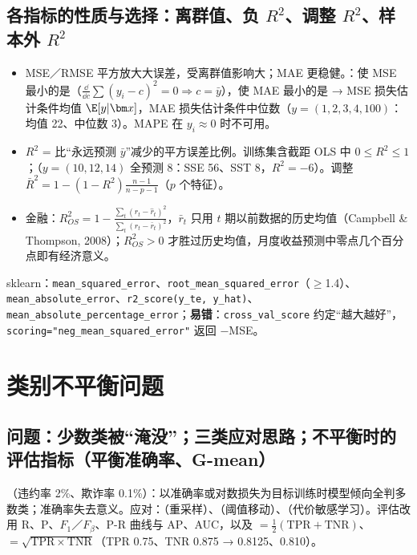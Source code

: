 \subsection{\texorpdfstring{各指标的性质与选择：离群值、负 $R^2$、调整 $R^2$、样本外 $R^2$}{各指标的性质与选择}}
\begin{itemize}
\item MSE／RMSE 平方放大大误差，受离群值影响大；MAE 更稳健。：使 MSE 最小的是（$\frac{\dd}{\dd c}\sum(y_i-c)^2=0\Rightarrow c=\bar y$），使 MAE 最小的是 → MSE 损失估计条件均值 $\E[y|\bm x]$，MAE 损失估计条件中位数（$y=(1,2,3,4,100)$：均值 22、中位数 3）。MAPE 在 $y_i\approx0$ 时不可用。
\item $R^2$ = 比“永远预测 $\bar y$”减少的平方误差比例。训练集含截距 OLS 中 $0\le R^2\le1$；（$y=(10,12,14)$ 全预测 8：SSE 56、SST 8，$R^2=-6$）。调整 $\bar R^2=1-(1-R^2)\frac{n-1}{n-p-1}$（$p$ 个特征）。
\item 金融：$R^2_{OS}=1-\frac{\sum_t(r_t-\hat r_t)^2}{\sum_t(r_t-\bar r_t)^2}$，$\bar r_t$ 只用 $t$ 期以前数据的历史均值（Campbell \& Thompson, 2008）；$R^2_{OS}>0$ 才胜过历史均值，月度收益预测中零点几个百分点即有经济意义。
\end{itemize}
\noindent sklearn：\texttt{mean\_squared\_error}、\texttt{root\_mean\_squared\_error}（$\ge$1.4）、\texttt{mean\_absolute\_error}、\texttt{r2\_score(y\_te, y\_hat)}、\texttt{mean\_absolute\_percentage\_error}；\textbf{易错}：\texttt{cross\_val\_score} 约定“越大越好”，\texttt{scoring="neg\_mean\_squared\_error"} 返回 $-$MSE。

\section{类别不平衡问题}

\subsection{问题：少数类被“淹没”；三类应对思路；不平衡时的评估指标（平衡准确率、G-mean）}
（违约率 2\%、欺诈率 0.1\%）：以准确率或对数损失为目标训练时模型倾向全判多数类；准确率失去意义。应对：（重采样）、（阈值移动）、（代价敏感学习）。评估改用 R、P、$F_1$／$F_\beta$、P-R 曲线与 AP、AUC，以及 $=\frac12(\mathrm{TPR}+\mathrm{TNR})$、 $=\sqrt{\mathrm{TPR}\times\mathrm{TNR}}$（TPR 0.75、TNR 0.875 → 0.8125、0.810）。


